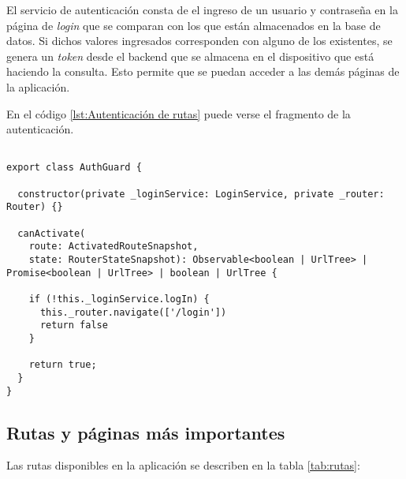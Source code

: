 El servicio de autenticación consta de el ingreso de un usuario y contraseña en la página de \textit{login} que se comparan con los que están almacenados en la base de datos. Si dichos valores ingresados corresponden con alguno de los existentes, se genera un \textit{token} desde el backend que se almacena en el dispositivo que está haciendo la consulta. Esto permite que se puedan acceder a las demás páginas de la aplicación.

En el código \ref{lst:Autenticación de rutas} puede verse el fragmento de la autenticación.



\begin{lstlisting}[caption={Autenticación de rutas}, label={lst:Autenticación de rutas}]

export class AuthGuard {

  constructor(private _loginService: LoginService, private _router: Router) {}

  canActivate(
    route: ActivatedRouteSnapshot,
    state: RouterStateSnapshot): Observable<boolean | UrlTree> | Promise<boolean | UrlTree> | boolean | UrlTree {
    
    if (!this._loginService.logIn) {
      this._router.navigate(['/login'])
      return false
    }

    return true;
  }
}
\end{lstlisting}

\subsection{Rutas y páginas más importantes}

Las rutas disponibles en la aplicación se describen en la tabla \ref{tab:rutas}:

